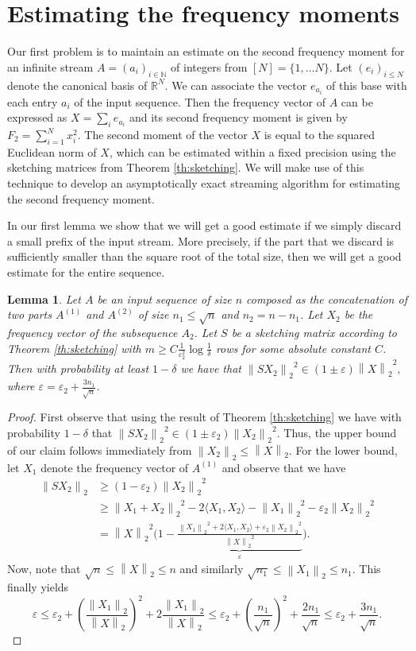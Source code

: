 \documentclass[a4paper,11pt,oneside,english,onecolumn]{article}
\newtheorem{lemma}[theorem]{Lemma}
\theoremstyle{definition}
\newcommand{\norm}[1]{\ensuremath{\left\| #1\right\|_2}}
\newcommand{\REAL}{\ensuremath{\mathbb{R}}}
\newcommand{\eps}{\ensuremath{\varepsilon}}
\begin{document}
\section{Estimating the frequency moments}
\label{section:F2}

Our first problem is to maintain an estimate on the second frequency moment for an infinite stream $A=(a_i)_{i\in\mathbb{N}}$ of integers from $[N] = \{1, \ldots N\}$. Let $(e_i)_{i \leq N}$ denote the canonical basis of $\REAL^N$. We can associate the vector $e_{a_i}$ of this base with each entry $a_i$ of the input sequence. Then the frequency vector of $A$ can be expressed as $X = \sum_i e_{a_i}$ and its second frequency moment is given by $F_2=\sum_{i=1}^N x_i^2$. The second moment of the vector $X$ is equal to the squared Euclidean norm of $X$, which can be estimated within a fixed precision using the sketching matrices from Theorem \ref{th:sketching}. We will make use of this technique to develop an asymptotically exact streaming algorithm for estimating the second frequency moment.

In our first lemma we show that we will get a good estimate if we simply discard a small prefix of the input stream. More precisely, if the part that we discard is sufficiently smaller than the square root of the total size, then we will get a good estimate for the entire sequence.
\begin{lemma}
\label{lemma:F2}
Let $A$ be an input sequence of size $n$ composed as the concatenation of two parts $A^{(1)}$ and $A^{(2)}$ of size $n_1\leq \sqrt{n}$ and $n_2=n-n_1$. Let $X_2$ be the frequency vector of the subsequence $A_2$. Let $S$ be a sketching matrix according to Theorem \ref{th:sketching} with $m \geq C \frac{1}{\eps_2^2}\log{\frac{1}{\delta}}$ rows for some absolute constant $C$. Then with probability at least $1 - \delta$ we have that $\norm{SX_2}^2 \in (1 \pm \eps)\norm{X}^2,$ where $\eps = \eps_2 + \frac{3n_1}{\sqrt n}$.
\end{lemma}

\begin{proof}
First observe that using the result of Theorem \ref{th:sketching} we have with probability $1 - \delta$ that $\norm{SX_2}^2 \in (1 \pm \eps_2)\norm{X_2}^2.$ Thus, the upper bound of our claim follows immediately from $\norm{X_2} \leq \norm{X}$. For the lower bound, let $X_1$ denote the frequency vector of $A^{(1)}$ and observe that we have
\begin{align*}
\norm{SX_2} &\geq (1  - \eps_2)\norm{X_2}^2 \\
&\geq \norm{X_1 + X_2}^2 - 2\langle X_1, X_2\rangle - \norm{X_1}^2 - \eps_2\norm{X_2}^2\\ 
&=\norm{X}^2 \Big(1 - \underbrace{\frac{\norm{X_1}^2 + 2\langle X_1, X_2 \rangle + \eps_2 \norm{X_2}^2}{\norm{X}^2}}_{\eps}\Big).
\end{align*}
Now, note that $\sqrt{n} \leq \norm{X} \leq n$ and similarly $\sqrt{n_1} \leq \norm{X_1} \leq n_1$. This finally yields 
$$\eps \leq \eps_2 + \left( \frac{\norm{X_1}}{\norm{X}}\right)^2 + 2 \frac{\norm{X_1}}{\norm{X}} \leq \eps_2 + \left(\frac{n_1}{\sqrt{n}}\right)^2 + \frac{2 n_1}{\sqrt{n}} \leq \eps_2 + \frac{3 n_1}{\sqrt{n}}.$$
\end{proof}
\end{document}
